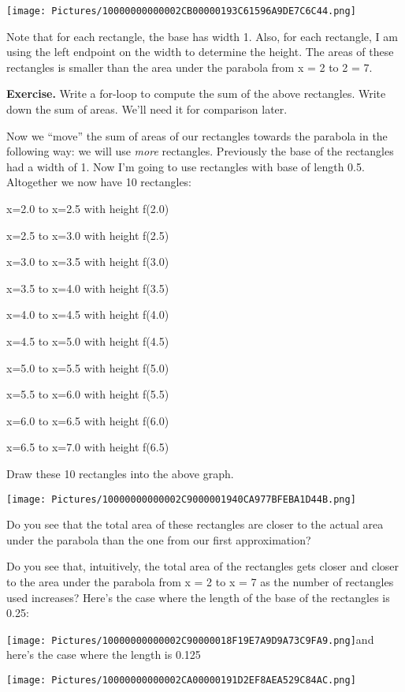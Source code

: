 \documentclass[
]{article}
\begin{document}
\texttt{[image: Pictures/10000000000002CB00000193C61596A9DE7C6C44.png]}

Note that for each rectangle, the base has width 1. Also, for each
rectangle, I am using the left endpoint on the width to determine the
height. The areas of these rectangles is smaller than the area under the
parabola from x = 2 to 2 = 7.

\textbf{Exercise.} Write a for-loop to compute the sum of the above
rectangles. Write down the sum of areas. We'll need it for comparison
later.

Now we ``move'' the sum of areas of our rectangles towards the parabola
in the following way: we will use \emph{more} rectangles. Previously the
base of the rectangles had a width of 1. Now I'm going to use rectangles
with base of length 0.5. Altogether we now have 10 rectangles:

x=2.0 to x=2.5 with height f(2.0)

x=2.5 to x=3.0 with height f(2.5)

x=3.0 to x=3.5 with height f(3.0)

x=3.5 to x=4.0 with height f(3.5)

x=4.0 to x=4.5 with height f(4.0)

x=4.5 to x=5.0 with height f(4.5)

x=5.0 to x=5.5 with height f(5.0)

x=5.5 to x=6.0 with height f(5.5)

x=6.0 to x=6.5 with height f(6.0)

x=6.5 to x=7.0 with height f(6.5)

Draw these 10 rectangles into the above graph.

\texttt{[image: Pictures/10000000000002C9000001940CA977BFEBA1D44B.png]}

Do you see that the total area of these rectangles are closer to the
actual area under the parabola than the one from our first
approximation?

Do you see that, intuitively, the total area of the rectangles gets
closer and closer to the area under the parabola from x = 2 to x = 7 as
the number of rectangles used increases? Here's the case where the
length of the base of the rectangles is 0.25:

\texttt{[image: Pictures/10000000000002C90000018F19E7A9D9A73C9FA9.png]}and
here's the case where the length is 0.125

\texttt{[image: Pictures/10000000000002CA00000191D2EF8AEA529C84AC.png]}
\end{document}
